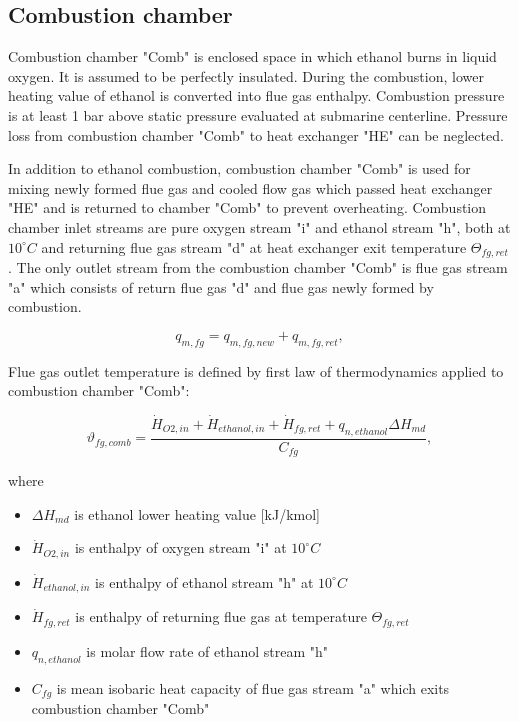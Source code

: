 \documentclass[openany]{book}
\begin{document}
	\subsection{Combustion chamber}
	
	Combustion chamber "Comb" is enclosed space in which ethanol burns in 
	liquid oxygen. It is assumed to be perfectly insulated. During the 
	combustion, lower heating value of ethanol is converted into flue gas 
	enthalpy. Combustion pressure is at least 1 bar above static pressure 
	evaluated at submarine centerline. Pressure loss from combustion chamber 
	"Comb" to heat exchanger "HE" can be neglected.
	
	In addition to ethanol combustion, combustion chamber "Comb" is used for 
	mixing newly formed flue gas and cooled flow gas which passed heat 
	exchanger "HE" and is returned to chamber "Comb" to prevent overheating. 
	Combustion chamber inlet streams are pure oxygen stream "i" and ethanol 
	stream "h", both at $10^{\circ}C$ and returning flue gas stream "d" at heat 
	exchanger exit temperature  $\Theta_{fg,ret}$. The only outlet stream from 
	the combustion chamber "Comb" is flue gas stream "a" which consists of 
	return flue gas "d" and flue gas newly formed by combustion. 
	
	\begin{equation}\label{eq:flue_gas_stream_new}
	q_{m,fg} = q_{m,fg,new} + q_{m,fg,ret},
	\end{equation}
	
	\noindent
	Flue gas outlet temperature is defined by first law of thermodynamics 
	applied to combustion chamber "Comb":
	
	\begin{equation}\label{eq:flue_gas_out_temp}
	\vartheta_{fg,comb} = \frac{\dot{H}_{O2,in} + \dot{H}_{ethanol,in} 
	+\dot{H}_{fg,ret} + q_{n,ethanol} \Delta H_{md}}{C_{fg}},
	\end{equation}
	
	\noindent
	where
	
	\begin{itemize}
		\item $\Delta H_{md}$ is ethanol lower heating value [kJ/kmol]
		\item $\dot{H}_{O2,in}$ is enthalpy of oxygen stream "i" at $10^\circ C$
		\item $\dot{H}_{ethanol,in}$ is enthalpy of ethanol stream "h" at 
		$10^\circ C$
		\item $\dot{H}_{fg,ret}$ is enthalpy of returning flue gas at 
		temperature $\Theta_{fg,ret}$
		\item $q_{n,ethanol}$ is molar flow rate of ethanol stream "h"
		\item $C_{fg}$ is mean isobaric heat capacity of flue gas stream "a" 
		which exits combustion chamber "Comb"
	\end{itemize}
	
\end{document}
